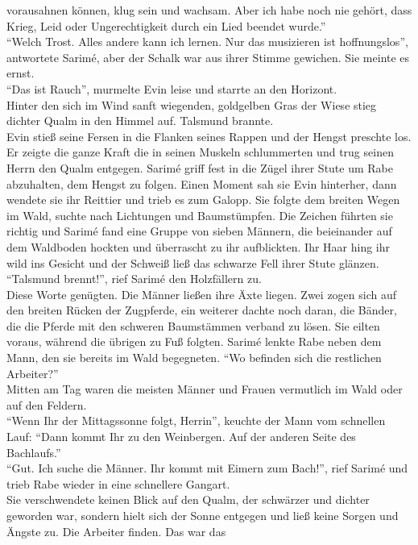 vorausahnen können, klug sein und wachsam. Aber ich habe noch nie gehört, 
dass Krieg, Leid oder Ungerechtigkeit durch ein Lied beendet wurde.''\\
``Welch Trost. Alles andere kann ich lernen. Nur das musizieren ist hoffnungslos'', antwortete 
Sarimé, aber der Schalk war aus ihrer Stimme gewichen. Sie meinte es ernst.\\
``Das ist Rauch'', murmelte Evin leise und starrte an den Horizont.\\
Hinter den sich im Wind sanft wiegenden, goldgelben Gras der Wiese stieg dichter Qualm in den 
Himmel auf. Talsmund brannte.\\
Evin stieß seine Fersen in die Flanken seines Rappen und der Hengst preschte los. Er zeigte die 
ganze Kraft die in seinen Muskeln schlummerten und trug seinen Herrn den Qualm entgegen. Sarimé 
griff fest in die Zügel ihrer Stute um Rabe abzuhalten, dem Hengst zu folgen. Einen Moment sah sie 
Evin hinterher, dann wendete sie ihr Reittier und trieb es zum Galopp. Sie folgte dem breiten Wegen 
im Wald, suchte nach Lichtungen und Baumstümpfen. Die Zeichen führten sie richtig und Sarimé fand 
eine Gruppe von sieben Männern, die beieinander auf dem Waldboden hockten und überrascht zu ihr 
aufblickten. Ihr Haar hing ihr wild ins Gesicht und der Schweiß ließ das schwarze Fell ihrer 
Stute glänzen.\\
``Talsmund brennt!'', rief Sarimé den Holzfällern zu.\\
Diese Worte genügten. Die Männer ließen ihre Äxte liegen. Zwei zogen sich auf den breiten Rücken 
der Zugpferde, ein weiterer dachte noch daran, die Bänder, die die Pferde mit den schweren 
Baumstämmen verband zu lösen. Sie eilten voraus, während die übrigen zu Fuß folgten. Sarimé lenkte 
Rabe neben dem Mann, den sie bereits im Wald begegneten. ``Wo befinden sich die restlichen 
Arbeiter?''\\
Mitten am Tag waren die meisten Männer und Frauen vermutlich im Wald oder auf den Feldern.\\
``Wenn Ihr der Mittagssonne folgt, Herrin'', keuchte der Mann vom schnellen Lauf: ``Dann kommt Ihr 
zu den Weinbergen. Auf der anderen Seite des Bachlaufs.''\\
``Gut. Ich suche die Männer. Ihr kommt mit Eimern zum Bach!'', rief Sarimé und trieb Rabe wieder in 
eine schnellere Gangart.\\
Sie verschwendete keinen Blick auf den Qualm, der schwärzer und dichter geworden war, sondern hielt 
sich der Sonne entgegen und ließ keine Sorgen und Ängste zu. Die Arbeiter finden. Das war das 
